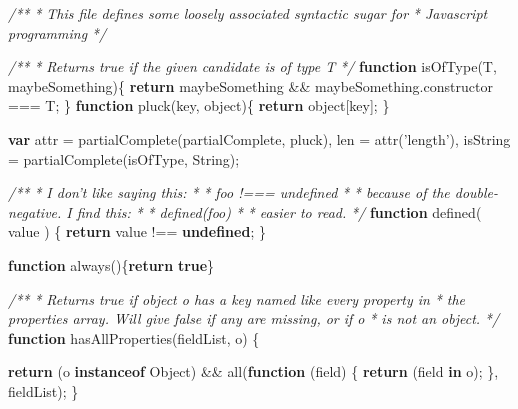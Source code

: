 \documentclass[]{article}
\newenvironment{Shaded}{}{}
\newcommand{\KeywordTok}[1]{\textcolor[rgb]{0.00,0.44,0.13}{\textbf{{#1}}}}
\newcommand{\StringTok}[1]{\textcolor[rgb]{0.25,0.44,0.63}{{#1}}}
\newcommand{\CommentTok}[1]{\textcolor[rgb]{0.38,0.63,0.69}{\textit{{#1}}}}
\newcommand{\OtherTok}[1]{\textcolor[rgb]{0.00,0.44,0.13}{{#1}}}
\newcommand{\FunctionTok}[1]{\textcolor[rgb]{0.02,0.16,0.49}{{#1}}}
\newcommand{\NormalTok}[1]{{#1}}
\begin{document}
\begin{Shaded}
\begin{Highlighting}[]
\CommentTok{/**}
\CommentTok{ * This file defines some loosely associated syntactic sugar for }
\CommentTok{ * Javascript programming }
\CommentTok{ */}


\CommentTok{/**}
\CommentTok{ * Returns true if the given candidate is of type T}
\CommentTok{ */}
\KeywordTok{function} \FunctionTok{isOfType}\NormalTok{(T, maybeSomething)\{}
   \KeywordTok{return} \NormalTok{maybeSomething && }\OtherTok{maybeSomething}\NormalTok{.}\FunctionTok{constructor} \NormalTok{=== T;}
\NormalTok{\}}
\KeywordTok{function} \FunctionTok{pluck}\NormalTok{(key, object)\{}
   \KeywordTok{return} \NormalTok{object[key];}
\NormalTok{\}}

\KeywordTok{var} \NormalTok{attr = }\FunctionTok{partialComplete}\NormalTok{(partialComplete, pluck),}
    \NormalTok{len = }\FunctionTok{attr}\NormalTok{(}\StringTok{'length'}\NormalTok{),    }
    \NormalTok{isString = }\FunctionTok{partialComplete}\NormalTok{(isOfType, String);}

\CommentTok{/** }
\CommentTok{ * I don't like saying this:}
\CommentTok{ * }
\CommentTok{ *    foo !=== undefined}
\CommentTok{ *    }
\CommentTok{ * because of the double-negative. I find this:}
\CommentTok{ * }
\CommentTok{ *    defined(foo)}
\CommentTok{ *    }
\CommentTok{ * easier to read.}
\CommentTok{ */} 
\KeywordTok{function} \FunctionTok{defined}\NormalTok{( value ) \{}
   \KeywordTok{return} \NormalTok{value !== }\KeywordTok{undefined}\NormalTok{;}
\NormalTok{\}}

\KeywordTok{function} \FunctionTok{always}\NormalTok{()\{}\KeywordTok{return} \KeywordTok{true}\NormalTok{\}}

\CommentTok{/**}
\CommentTok{ * Returns true if object o has a key named like every property in }
\CommentTok{ * the properties array. Will give false if any are missing, or if o }
\CommentTok{ * is not an object.}
\CommentTok{ */}
\KeywordTok{function} \FunctionTok{hasAllProperties}\NormalTok{(fieldList, o) \{}

   \KeywordTok{return}      \NormalTok{(o }\KeywordTok{instanceof} \NormalTok{Object) }
            \NormalTok{&&}
               \FunctionTok{all}\NormalTok{(}\KeywordTok{function} \NormalTok{(field) \{         }
                  \KeywordTok{return} \NormalTok{(field }\KeywordTok{in} \NormalTok{o);         }
               \NormalTok{\}, fieldList);}
\NormalTok{\}}
\end{Highlighting}
\end{Shaded}
\end{document}
